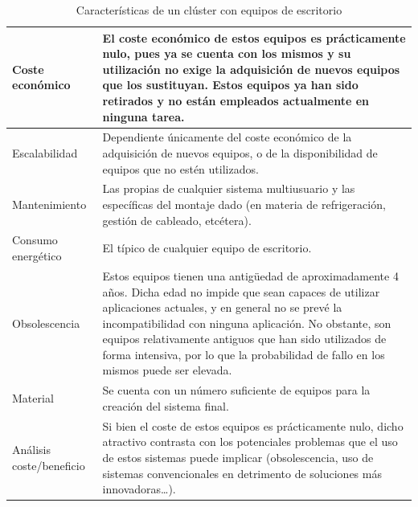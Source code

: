 \begin{table}[H]
\begin{tabular}{|p{2.4cm}|p{12cm}|}
\\
\hline
Coste económico&El coste económico de estos equipos es prácticamente nulo, pues ya se cuenta con los mismos y su utilización no exige la adquisición de nuevos equipos que los sustituyan. Estos equipos ya han sido retirados y no están empleados actualmente en ninguna tarea.\\
\hline
Escalabilidad&Dependiente únicamente del coste económico de la adquisición de nuevos equipos, o de la disponibilidad de equipos que no estén utilizados.\\
\hline
Mantenimiento&Las propias de cualquier sistema multiusuario y las específicas del montaje dado (en materia de refrigeración, gestión de cableado, etcétera).
\\
\hline
Consumo energético&El típico de cualquier equipo de escritorio.\\
\hline
Obsolescencia&Estos equipos tienen una antigüedad de aproximadamente 4 años. Dicha edad no impide que sean capaces de utilizar aplicaciones actuales, y en general no se prevé la incompatibilidad con ninguna aplicación. No obstante, son equipos relativamente antiguos que han sido utilizados de forma intensiva, por lo que la probabilidad de fallo en los mismos puede ser elevada.\\
\hline
Material&Se cuenta con un número suficiente de equipos para la creación del sistema final.\\
\hline
Análisis coste/beneficio&Si bien el coste de estos equipos es prácticamente nulo, dicho atractivo contrasta con los potenciales problemas que el uso de estos sistemas puede implicar (obsolescencia, uso de sistemas convencionales en detrimento de soluciones más innovadoras\dots).\\
\hline
\end{tabular}
\caption{Características de un clúster con equipos de escritorio}
\end{table}

